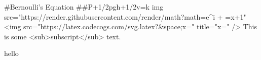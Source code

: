  #Bernoulli's Equation
 ##P+1/2pgh+1/2v=k
img src="https://render.githubusercontent.com/render/math?math=e^{i +\pi} =x+1"
<img src="https://latex.codecogs.com/svg.latex?\Large&space;x=" title="\Large x=" />
This is some <sub>subscript</sub> text.

hello

